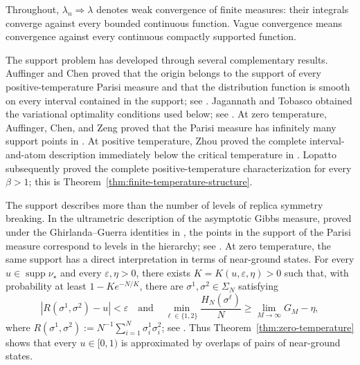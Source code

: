 \documentclass[10pt]{amsart}
\theoremstyle{definition}
\theoremstyle{remark}
\numberwithin{equation}{section}
\newcommand{\1}{\mathbf 1}
\newcommand{\supp}{\operatorname{supp}}
\begin{document}
Throughout, $\lambda_n\Longrightarrow\lambda$ denotes weak convergence of finite measures: their integrals converge against every bounded continuous function.  Vague convergence means convergence against every continuous compactly supported function.



The support problem has developed through several complementary results. Auffinger and Chen proved that the origin belongs to the support of every positive-temperature Parisi measure and that the distribution function is smooth on every interval contained in the support; see \cite[Theorems 1 and 2]{AuffingerChenProperties}. Jagannath and Tobasco obtained the variational optimality conditions used below; see \cite[Corollary 3.6 and Proposition 1.1]{JagannathTobasco2017}. At zero temperature, Auffinger, Chen, and Zeng proved that the Parisi measure has infinitely many support points in \cite[Theorem 1]{AuffingerChenZeng}. At positive temperature, Zhou proved the complete interval-and-atom description immediately below the critical temperature in \cite[Theorem 1]{Zhou2025}. Lopatto subsequently proved the complete positive-temperature characterization for every $\beta>1$; this is Theorem~\ref{thm:finite-temperature-structure}.

The support describes more than the number of levels of replica symmetry breaking. In the ultrametric description of the asymptotic Gibbs measure, proved under the Ghirlanda--Guerra identities in \cite[Theorem 1]{PanchenkoUltrametricity}, the points in the support of the Parisi measure correspond to levels in the hierarchy; see \cite[Section~1]{AuffingerChenZeng}. At zero temperature, the same support has a direct interpretation in terms of near-ground states. For every $u\in\supp\nu_\star$ and every $\varepsilon,\eta>0$, there exists $K=K(u,\varepsilon,\eta)>0$ such that, with probability at least $1-Ke^{-N/K}$, there are $\sigma^1,\sigma^2\in\Sigma_N$ satisfying
\begin{equation*}
 |R(\sigma^1,\sigma^2)-u|<\varepsilon
 \quad\text{and}\quad
 \min_{\ell\in\{1,2\}}\frac{H_N(\sigma^\ell)}N\geq\lim_{M\to\infty}G_M-\eta,
\end{equation*}
where $R(\sigma^1,\sigma^2):=N^{-1}\sum_{i=1}^N\sigma_i^1\sigma_i^2$; see \cite[Equation~(6)]{AuffingerChenZeng}. Thus Theorem~\ref{thm:zero-temperature} shows that every $u\in[0,1)$ is approximated by overlaps of pairs of near-ground states.
\end{document}
